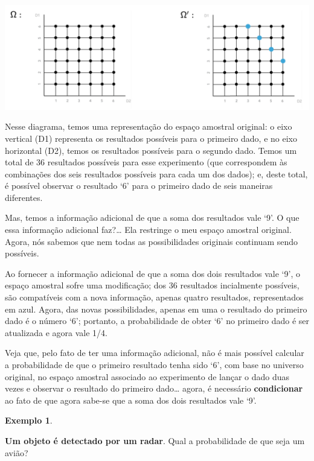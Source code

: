 \documentclass[
]{book}
\theoremstyle{definition}
\theoremstyle{definition}
\newtheorem{example}{Exemplo}[chapter]
\theoremstyle{definition}
\theoremstyle{remark}
\begin{document}
\includegraphics[width=1\linewidth]{img/pcondicional-soma-dados}

Nesse diagrama, temos uma representação do espaço amostral original: o eixo vertical (D1) representa os resultados possíveis para o primeiro dado, e no eixo horizontal (D2), temos os resultados possíveis para o segundo dado. Temos um total de 36 resultados possíveis para esse experimento (que correspondem às combinações dos seis resultados possíveis para cada um dos dados); e, deste total, é possível observar o resultado `6' para o primeiro dado de seis maneiras diferentes.

Mas, temos a informação adicional de que a soma dos resultados vale `9'. O que essa informação adicional faz?\ldots{} Ela restringe o meu espaço amostral original. Agora, nós sabemos que nem todas as possibilidades originais continuam sendo possíveis.

Ao fornecer a informação adicional de que a soma dos dois resultados vale `9', o espaço amostral sofre uma modificação; dos 36 resultados incialmente possíveis, são compatíveis com a nova informação, apenas quatro resultados, representados em azul. Agora, das novas possibilidades, apenas em uma o resultado do primeiro dado é o número `6'; portanto, a probabilidade de obter `6' no primeiro dado é ser atualizada e agora vale 1/4.

Veja que, pelo fato de ter uma informação adicional, não é mais possível calcular a probabilidade de que o primeiro resultado tenha sido `6', com base no universo original, no espaço amostral associado ao experimento de lançar o dado duas vezes e observar o resultado do primeiro dado\ldots{} agora, é necessário \textbf{condicionar} ao fato de que agora sabe-se que a soma dos dois resultados vale `9'.

\begin{example}
\protect\hypertarget{exm:unnamed-chunk-2}{}{\label{exm:unnamed-chunk-2} }
\end{example}

\textbf{Um objeto é detectado por um radar}. Qual a probabilidade de que seja um avião?
\end{document}
